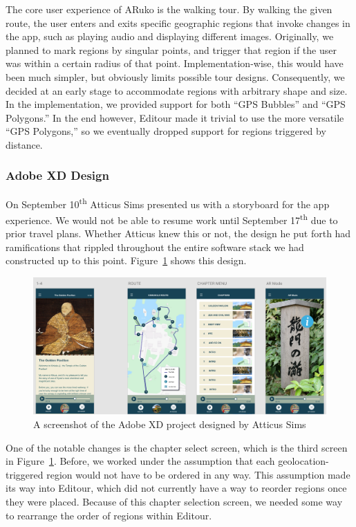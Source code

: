 \documentclass[a4paper, 10pt, american, titlepage]{article}
\begin{document}
The core user experience of ARuko is the walking tour. By walking the given
route, the user enters and exits specific geographic regions that invoke
changes in the app, such as playing audio and displaying different images.
Originally, we planned to mark regions by singular points, and trigger that
region if the user was within a certain radius of that point.
Implementation-wise, this would have been much simpler, but obviously limits
possible tour designs. Consequently, we decided at an early stage to
accommodate regions with arbitrary shape and size.  In the implementation, we
provided support for both ``GPS Bubbles'' and ``GPS Polygons.'' In the end
however, Editour made it trivial to use the more versatile ``GPS Polygons,'' so
we eventually dropped support for regions triggered by distance.

\subsubsection{Adobe XD Design}
\label{sec:adobeXdDesign}

On September 10\textsuperscript{th} Atticus Sims presented us with a storyboard
for the app experience. We would not be able to resume work until September
17\textsuperscript{th} due to prior travel plans. Whether Atticus knew this or
not, the design he put forth had ramifications that rippled throughout the
entire software stack we had constructed up to this point.
Figure~\ref{fig:adobeXdDesign} shows this design.

\begin{figure}[h]
	\centering
	\includegraphics[width=1\textwidth]{adobe-xd-design.png}
	\caption[A screenshot of the Adobe XD project designed by Atticus Sims]
    {A screenshot of the Adobe XD project designed by Atticus Sims}
	\label{fig:adobeXdDesign}
\end{figure}

One of the notable changes is the chapter select screen, which is the third
screen in Figure~\ref{fig:adobeXdDesign}. Before, we worked under the assumption
that each geolocation-triggered region would not have to be ordered in any way.
This assumption made its way into Editour, which did not currently have a way
to reorder regions once they were placed. Because of this chapter selection
screen, we needed some way to rearrange the order of regions within Editour.
\end{document}
